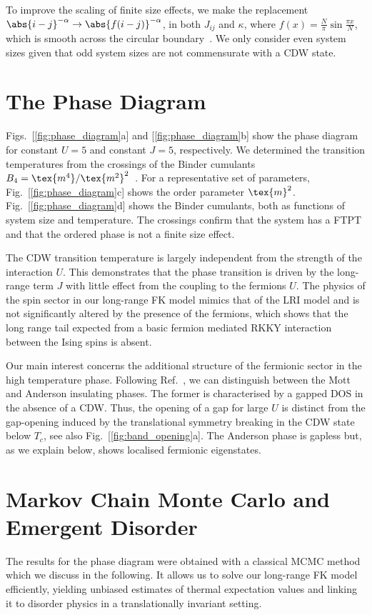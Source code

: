To improve the scaling of finite size effects, we make the replacement \( \abs{i - j}^{-\alpha} \rightarrow \abs{f(i - j)}^{-\alpha}\), in both \(J_{ij}\) and \(\kappa\), where \(f(x) = \frac{N}{\pi}\sin \frac{\pi x}{N}\), which is smooth across the circular boundary~\cite{fukuiOrderNClusterMonte2009}. We only consider even system sizes given that odd system sizes are not commensurate with a \ac{CDW} state. 


\section{The Phase Diagram} 
Figs.~[\ref{fig:phase_diagram}a] and [\ref{fig:phase_diagram}b] show the phase diagram for constant \(U=5\) and constant \(J=5\), respectively. We determined the transition temperatures from the crossings of the Binder cumulants \(B_4 = \tex{m^4}/\tex{m^2}^2\)~\cite{binderFiniteSizeScaling1981}. For a representative set of parameters, Fig.~[\ref{fig:phase_diagram}c] shows the order parameter \(\tex{m}^2\). Fig.~[\ref{fig:phase_diagram}d] shows the Binder cumulants, both as functions of system size and temperature. The crossings confirm that the system has a \ac{FTPT} and that the ordered phase is not a finite size effect. 

The CDW transition temperature is largely independent from the strength of the interaction \(U\). This demonstrates that the phase transition is driven by the long-range term \(J\) with little effect from the coupling to the fermions \(U\).  The physics of the spin sector in our long-range \ac{FK} model mimics that of the \ac{LRI} model and is not significantly altered by the presence of the fermions, which shows that the long range tail expected from a basic fermion mediated RKKY interaction between the Ising spins is absent. 

Our main interest concerns the additional structure of the fermionic sector in the high temperature phase. Following Ref.~\cite{antipovInteractionTunedAndersonMott2016}, we can distinguish between the Mott and Anderson insulating phases. The former is characterised by a gapped \ac{DOS} in the absence of a \ac{CDW}. Thus, the opening of a gap for large \(U\) is distinct from the gap-opening induced by the translational symmetry breaking in the CDW state below \(T_c\), see also Fig.~[\ref{fig:band_opening}a]. The Anderson phase is gapless but, as we explain below, shows localised fermionic eigenstates. 

\section{Markov Chain Monte Carlo and Emergent Disorder}
The results for the phase diagram were obtained with a classical \ac{MCMC} method which we discuss in the following. It allows us to solve our long-range \ac{FK} model efficiently, yielding unbiased estimates of thermal expectation values and linking it to disorder physics in a translationally invariant setting.

